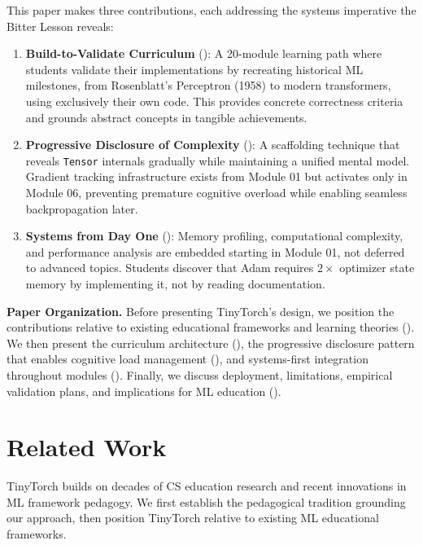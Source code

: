\documentclass[10pt,twocolumn]{article}
\begin{document}
This paper makes three contributions, each addressing the systems imperative the Bitter Lesson reveals:

\begin{enumerate}[leftmargin=*, itemsep=0.5em]
\item \textbf{Build-to-Validate Curriculum} (): A 20-module learning path where students validate their implementations by recreating historical ML milestones, from Rosenblatt's Perceptron (1958) to modern transformers, using exclusively their own code. This provides concrete correctness criteria and grounds abstract concepts in tangible achievements.

\item \textbf{Progressive Disclosure of Complexity} (): A scaffolding technique that reveals \texttt{Tensor} internals gradually while maintaining a unified mental model. Gradient tracking infrastructure exists from Module 01 but activates only in Module 06, preventing premature cognitive overload while enabling seamless backpropagation later.

\item \textbf{Systems from Day One} (): Memory profiling, computational complexity, and performance analysis are embedded starting in Module 01, not deferred to advanced topics. Students discover that Adam requires $2\times$ optimizer state memory by implementing it, not by reading documentation.
\end{enumerate}

\textbf{Paper Organization.} Before presenting TinyTorch's design, we position the contributions relative to existing educational frameworks and learning theories (). We then present the curriculum architecture (), the progressive disclosure pattern that enables cognitive load management (), and systems-first integration throughout modules (). Finally, we discuss deployment, limitations, empirical validation plans, and implications for ML education ().


  
 
\section{Related Work}
\label{sec:related}

TinyTorch builds on decades of CS education research and recent innovations in ML framework pedagogy. We first establish the pedagogical tradition grounding our approach, then position TinyTorch relative to existing ML educational frameworks.
\end{document}
